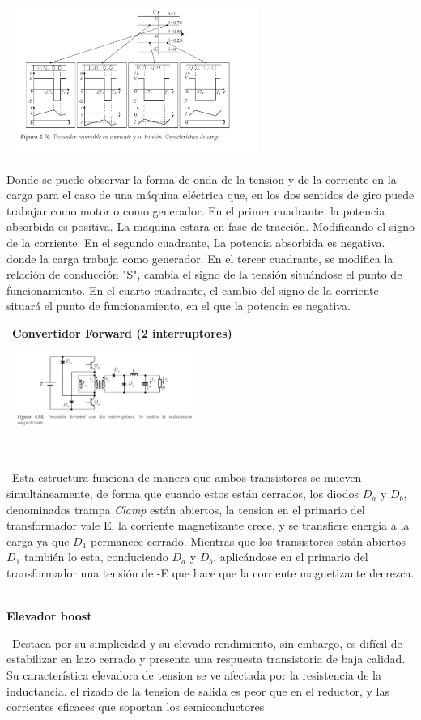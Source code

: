 \documentclass[12pt,letterpaper]{article}
\begin{document}
\
\includegraphics[width=8cm]{Caracteristicas de carga Full Bridge.png} 
\

Donde se puede observar la forma de onda de la tension y de la corriente en la carga para el caso de una máquina eléctrica que, en los dos sentidos de giro puede trabajar como motor o como generador.
En el primer cuadrante, la potencia absorbida es positiva. La maquina estara en fase de tracción. Modificando el signo de la corriente.
En el segundo cuadrante, La potencia absorbida es negativa. donde la carga trabaja como generador.
En el tercer cuadrante, se modifica la relación de conducción "S", cambia el signo de la tensión situándose el punto de funcionamiento.
En el cuarto cuadrante, el cambio del signo de la corriente situará el punto de funcionamiento, en el que la potencia es negativa.


\
\textbf{Convertidor Forward (2 interruptores)}
\

\
\includegraphics[width=6cm]{Forward.png} 

\

\
Esta estructura funciona de manera que ambos transistores se mueven simultáneamente, de forma que cuando estos están cerrados, los diodos $D_a$ y $D_b$, denominados trampa \textit{Clamp} están abiertos, la tension en el primario del transformador vale E, la corriente magnetizante crece, y se transfiere energía a la carga ya que $D_1$ permanece cerrado. Mientras que los transistores están abiertos $D_1$ también lo esta, conduciendo $D_a$ y $D_b$, aplicándose en el primario del transformador una tensión de -E que hace que la corriente magnetizante decrezca.
\

\newpage
\textbf{Elevador boost}

\
Destaca por su simplicidad y su elevado rendimiento, sin embargo, es difícil de estabilizar en lazo cerrado y presenta una respuesta transistoria de baja calidad. Su característica elevadora de tension se ve afectada por la resistencia de la inductancia. el rizado de la tension de salida es peor que en el reductor, y las corrientes eficaces que soportan los semiconductores
\end{document}
